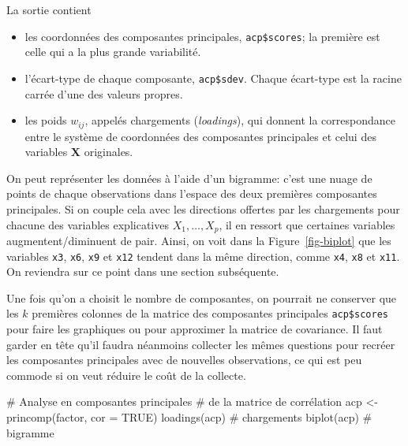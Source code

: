 \documentclass[
  11pt,
  letterpaper,
]{scrbook}
\newenvironment{Shaded}{\begin{snugshade}}{\end{snugshade}}
\newcommand{\AttributeTok}[1]{\textcolor[rgb]{0.40,0.45,0.13}{#1}}
\newcommand{\CommentTok}[1]{\textcolor[rgb]{0.37,0.37,0.37}{#1}}
\newcommand{\ConstantTok}[1]{\textcolor[rgb]{0.56,0.35,0.01}{#1}}
\newcommand{\FunctionTok}[1]{\textcolor[rgb]{0.28,0.35,0.67}{#1}}
\newcommand{\NormalTok}[1]{\textcolor[rgb]{0.00,0.23,0.31}{#1}}
\newcommand{\OtherTok}[1]{\textcolor[rgb]{0.00,0.23,0.31}{#1}}
\providecommand{\tightlist}{%
  \setlength{\itemsep}{0pt}\setlength{\parskip}{0pt}}\usepackage{longtable,booktabs,array}
\theoremstyle{definition}
\theoremstyle{remark}
\begin{document}
La sortie contient

\begin{itemize}
\tightlist
\item
  les coordonnées des composantes principales, \texttt{acp\$scores}; la
  première est celle qui a la plus grande variabilité.
\item
  l'écart-type de chaque composante, \texttt{acp\$sdev}. Chaque
  écart-type est la racine carrée d'une des valeurs propres.
\item
  les poids \(w_{ij}\), appelés chargements (\emph{loadings}), qui
  donnent la correspondance entre le système de coordonnées des
  composantes principales et celui des variables \(\boldsymbol{X}\)
  originales.
\end{itemize}

On peut représenter les données à l'aide d'un bigramme: c'est une nuage
de points de chaque observations dans l'espace des deux premières
composantes principales. Si on couple cela avec les directions offertes
par les chargements pour chacune des variables explicatives
\(X_1, \ldots, X_p\), il en ressort que certaines variables
augmentent/diminuent de pair. Ainsi, on voit dans la
Figure~\ref{fig-biplot} que les variables \texttt{x3}, \texttt{x6},
\texttt{x9} et \texttt{x12} tendent dans la même direction, comme
\texttt{x4}, \texttt{x8} et \texttt{x11}. On reviendra sur ce point dans
une section subséquente.

Une fois qu'on a choisit le nombre de composantes, on pourrait ne
conserver que les \(k\) premières colonnes de la matrice des composantes
principales \texttt{acp\$scores} pour faire les graphiques ou pour
approximer la matrice de covariance. Il faut garder en tête qu'il faudra
néanmoins collecter les mêmes questions pour recréer les composantes
principales avec de nouvelles observations, ce qui est peu commode si on
veut réduire le coût de la collecte.

\begin{Shaded}
\begin{Highlighting}[]
\CommentTok{\# Analyse en composantes principales}
\CommentTok{\# de la matrice de corrélation}
\NormalTok{acp }\OtherTok{\textless{}{-}} \FunctionTok{princomp}\NormalTok{(factor, }\AttributeTok{cor =} \ConstantTok{TRUE}\NormalTok{)}
\FunctionTok{loadings}\NormalTok{(acp) }\CommentTok{\# chargements}
\FunctionTok{biplot}\NormalTok{(acp) }\CommentTok{\# bigramme}
\end{Highlighting}
\end{Shaded}
\end{document}
